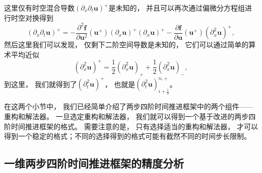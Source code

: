 这里仅有时空混合导数$\left({\partial_{x}}{\partial_{t}}{\bm{u}}\right)^+$是未知的，
并且可以再次通过偏微分方程组进行时空对换得到
\begin{equation}
  \label{eq:A-2}
  \left({\partial_{x}}{\partial_{t}} {\bm{u}}\right)^+ = -\frac{\partial^2{\bm{f}}}{\partial{\bm{u}}^2}({\bm{u}}^+) \left({\partial_{x}}{\bm{u}}\right)^+ \left({\partial_{x}}{\bm{u}}\right)^+ - \frac{\partial{\bm{f}}}{\partial{\bm{u}}}({\bm{u}}^+) \left({\partial_{x}^2}{\bm{u}}\right)^+,
\end{equation}
然后这里我们可以发现，
仅剩下二阶空间导数是未知的，
它们可以通过简单的算术平均近似
\begin{equation}
  \label{eq:A-3}
  \left({\partial_{x}^2}{\bm{u}}\right)^+ = \frac12 \left({\partial_{x}^2}{\bm{u}}\right)_+ + \frac12 \left({\partial_{x}^2}{\bm{u}}\right)_-,
\end{equation}
到这里，
我们就得到了$\left({\partial_{t}^2} {\bm{u}}\right)^+$，
也就是$\left({\partial_{t}^2} {\bm{u}}\right)_{i+\frac{1}{2}}^{n,+}$。

\vspace{\baselineskip} %
在这两个小节中，
我们已经简单介绍了两步四阶时间推进框架中的两个组件——重构和解法器。
一旦选定重构和解法器，
我们就可以得到一个基于改进的两步四阶时间推进框架的格式。
需要注意的是，
只有选择适当的重构和解法器，
才可以得到一个稳定的格式；不同的选择得到的格式可能有截然不同的时间步长限制。

\subsection{一维两步四阶时间推进框架的精度分析}
\label{sec:1D-JD}

